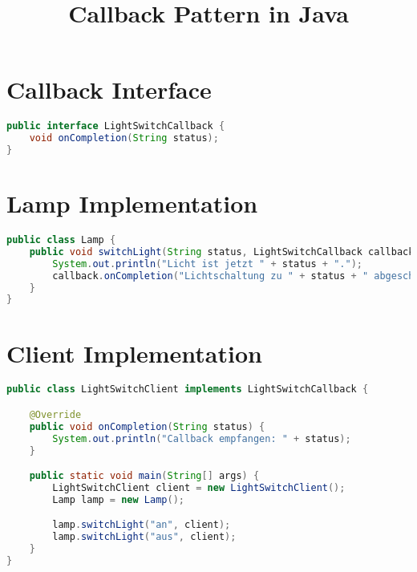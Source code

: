 \documentclass{article}
\title{Callback Pattern in Java}
\author{}
\date{}
\begin{document}
\maketitle

\section*{Callback Interface}

\begin{lstlisting}[language=Java, caption=LightSwitchCallback Interface]
public interface LightSwitchCallback {
    void onCompletion(String status);
}
\end{lstlisting}

\section*{Lamp Implementation}

\begin{lstlisting}[language=Java, caption=Lamp Class]
public class Lamp {
    public void switchLight(String status, LightSwitchCallback callback) {
        System.out.println("Licht ist jetzt " + status + ".");
        callback.onCompletion("Lichtschaltung zu " + status + " abgeschlossen.");
    }
}
\end{lstlisting}

\section*{Client Implementation}

\begin{lstlisting}[language=Java, caption=LightSwitchClient Class]
public class LightSwitchClient implements LightSwitchCallback {

    @Override
    public void onCompletion(String status) {
        System.out.println("Callback empfangen: " + status);
    }

    public static void main(String[] args) {
        LightSwitchClient client = new LightSwitchClient();
        Lamp lamp = new Lamp();

        lamp.switchLight("an", client);
        lamp.switchLight("aus", client);
    }
}
\end{lstlisting}
\end{document}
